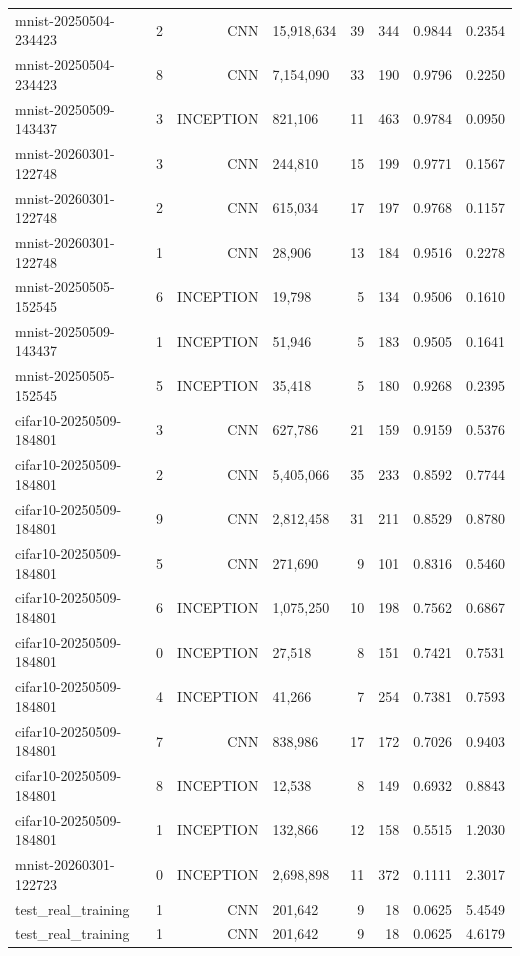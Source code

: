 \begin{tabular}{llrlrrrr}
mnist-20250504-234423 & 2 & CNN & 15,918,634 & 39 & 344 & 0.9844 & 0.2354 \\
mnist-20250504-234423 & 8 & CNN & 7,154,090 & 33 & 190 & 0.9796 & 0.2250 \\
mnist-20250509-143437 & 3 & INCEPTION & 821,106 & 11 & 463 & 0.9784 & 0.0950 \\
mnist-20260301-122748 & 3 & CNN & 244,810 & 15 & 199 & 0.9771 & 0.1567 \\
mnist-20260301-122748 & 2 & CNN & 615,034 & 17 & 197 & 0.9768 & 0.1157 \\
mnist-20260301-122748 & 1 & CNN & 28,906 & 13 & 184 & 0.9516 & 0.2278 \\
mnist-20250505-152545 & 6 & INCEPTION & 19,798 & 5 & 134 & 0.9506 & 0.1610 \\
mnist-20250509-143437 & 1 & INCEPTION & 51,946 & 5 & 183 & 0.9505 & 0.1641 \\
mnist-20250505-152545 & 5 & INCEPTION & 35,418 & 5 & 180 & 0.9268 & 0.2395 \\
cifar10-20250509-184801 & 3 & CNN & 627,786 & 21 & 159 & 0.9159 & 0.5376 \\
cifar10-20250509-184801 & 2 & CNN & 5,405,066 & 35 & 233 & 0.8592 & 0.7744 \\
cifar10-20250509-184801 & 9 & CNN & 2,812,458 & 31 & 211 & 0.8529 & 0.8780 \\
cifar10-20250509-184801 & 5 & CNN & 271,690 & 9 & 101 & 0.8316 & 0.5460 \\
cifar10-20250509-184801 & 6 & INCEPTION & 1,075,250 & 10 & 198 & 0.7562 & 0.6867 \\
cifar10-20250509-184801 & 0 & INCEPTION & 27,518 & 8 & 151 & 0.7421 & 0.7531 \\
cifar10-20250509-184801 & 4 & INCEPTION & 41,266 & 7 & 254 & 0.7381 & 0.7593 \\
cifar10-20250509-184801 & 7 & CNN & 838,986 & 17 & 172 & 0.7026 & 0.9403 \\
cifar10-20250509-184801 & 8 & INCEPTION & 12,538 & 8 & 149 & 0.6932 & 0.8843 \\
cifar10-20250509-184801 & 1 & INCEPTION & 132,866 & 12 & 158 & 0.5515 & 1.2030 \\
mnist-20260301-122723 & 0 & INCEPTION & 2,698,898 & 11 & 372 & 0.1111 & 2.3017 \\
test_real_training & 1 & CNN & 201,642 & 9 & 18 & 0.0625 & 5.4549 \\
test_real_training & 1 & CNN & 201,642 & 9 & 18 & 0.0625 & 4.6179 \\
\bottomrule
\end{tabular}